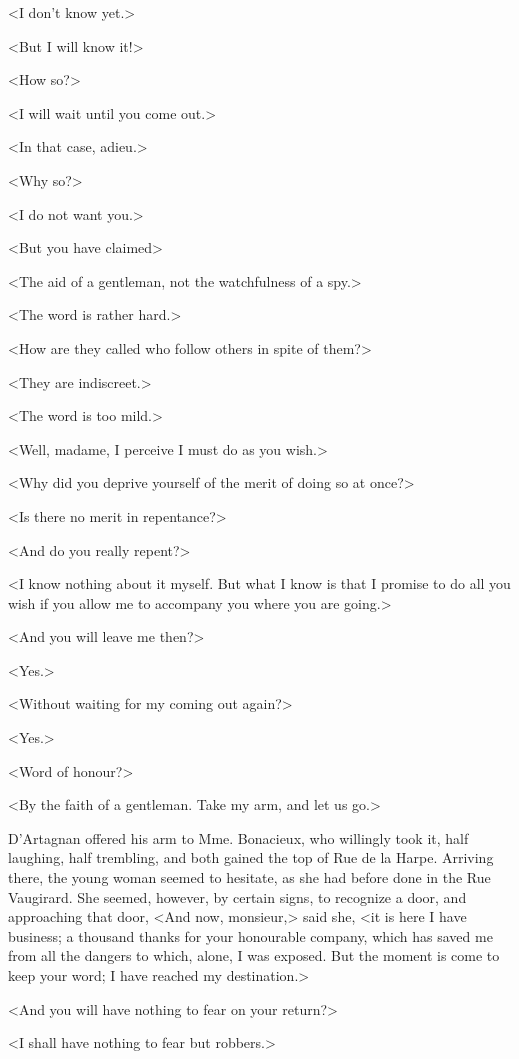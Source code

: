 <I don't know yet.> 

<But I will know it!> 

<How so?> 

<I will wait until you come out.> 

<In that case, adieu.> 

<Why so?> 

<I do not want you.> 

<But you have claimed\longdash> 

<The aid of a gentleman, not the watchfulness of a spy.> 

<The word is rather hard.> 

<How are they called who follow others in spite of them?> 

<They are indiscreet.> 

<The word is too mild.> 

<Well, madame, I perceive I must do as you wish.> 

<Why did you deprive yourself of the merit of doing so at once?> 

<Is there no merit in repentance?> 

<And do you really repent?> 

<I know nothing about it myself. But what I know is that I promise to do all you wish if you allow me to accompany you where you are going.> 

<And you will leave me then?> 

<Yes.> 

<Without waiting for my coming out again?> 

<Yes.> 

<Word of honour?> 

<By the faith of a gentleman. Take my arm, and let us go.> 

D'Artagnan offered his arm to Mme. Bonacieux, who willingly took it, half laughing, half trembling, and both gained the top of Rue de la Harpe. Arriving there, the young woman seemed to hesitate, as she had before done in the Rue Vaugirard. She seemed, however, by certain signs, to recognize a door, and approaching that door, <And now, monsieur,> said she, <it is here I have business; a thousand thanks for your honourable company, which has saved me from all the dangers to which, alone, I was exposed. But the moment is come to keep your word; I have reached my destination.> 

<And you will have nothing to fear on your return?> 

<I shall have nothing to fear but robbers.> 


